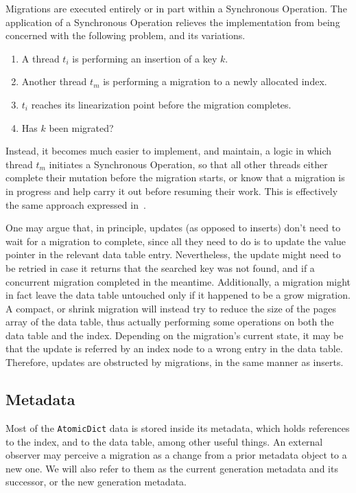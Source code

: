 Migrations are executed entirely or in part within a Synchronous Operation.
The application of a Synchronous Operation relieves the implementation from being concerned with the following problem, and its variations.
\begin{enumerate}
	\item A thread $t_i$ is performing an insertion of a key $k$.
	\item Another thread $t_m$ is performing a migration to a newly allocated index.
	\item $t_i$ reaches its linearization point before the migration completes.
	\item Has $k$ been migrated?
\end{enumerate}
Instead, it becomes much easier to implement, and maintain, a logic in which thread $t_m$ initiates a Synchronous Operation, so that all other threads either complete their mutation before the migration starts, or know that a migration is in progress and help carry it out before resuming their work.
This is effectively the same approach expressed in~\cite[\S5.3.2, Preventing Concurrent Updates to Ensure Consistency]{maier}.

One may argue that, in principle, updates (as opposed to inserts) don't need to wait for a migration to complete, since all they need to do is to update the value pointer in the relevant data table entry.
Nevertheless, the update might need to be retried in case it returns that the searched key was not found, and if a concurrent migration completed in the meantime.
Additionally, a migration might in fact leave the data table untouched only if it happened to be a grow migration.
A compact, or shrink migration will instead try to reduce the size of the pages array of the data table, thus actually performing some operations on both the data table and the index.
Depending on the migration's current state, it may be that the update is referred by an index node to a wrong entry in the data table.
Therefore, updates are obstructed by migrations, in the same manner as inserts.


\subsection{Metadata}\label{subsec:metadata}
Most of the \texttt{AtomicDict} data is stored inside its metadata, which holds references to the index, and to the data table, among other useful things.
An external observer may perceive a migration as a change from a prior metadata object to a new one.
We will also refer to them as the current generation metadata and its successor, or the new generation metadata.

